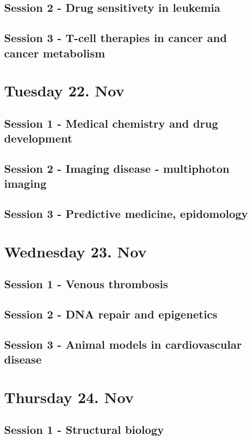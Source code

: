 \documentclass[12p]{article}
\begin{document}
\subsection*{Session 2 - Drug sensitivety in leukemia}

\subsection*{Session 3 - T-cell therapies in cancer and cancer metabolism}

\section*{Tuesday 22. Nov}
\subsection*{Session 1 - Medical chemistry and drug development}
\subsection*{Session 2 - Imaging disease - multiphoton imaging}
\subsection*{Session 3 - Predictive medicine, epidomology}
\section*{Wednesday 23. Nov}
\subsection*{Session 1 - Venous thrombosis}
\subsection*{Session 2 - DNA repair and epigenetics}
\subsection*{Session 3 - Animal models in cardiovascular disease}
\section*{Thursday 24. Nov}
\subsection*{Session 1 - Structural biology}
\end{document}
